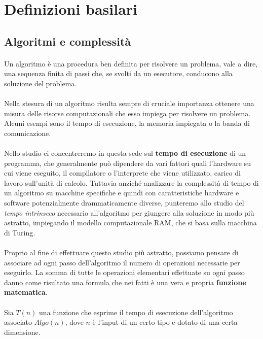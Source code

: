 \documentclass[11pt,a4paper,oneside]{article}
\begin{document}
\section{Definizioni basilari}
\subsection{Algoritmi e complessità}
\paragraph*{} Un algoritmo è una procedura ben definita per risolvere un problema, vale a dire, una sequenza finita di passi che, se svolti da un esecutore, conducono alla soluzione del problema.
\paragraph*{} Nella stesura di un algoritmo risulta sempre di cruciale importanza ottenere una misura delle risorse computazionali che esso impiega per risolvere un problema. Alcuni esempi sono il tempo di esecuzione, la memoria impiegata o la banda di comunicazione.
\paragraph*{} Nello studio ci concentreremo in questa sede sul \textbf{tempo di esecuzione} di un programma, che generalmente può dipendere da vari fattori quali l'hardware su cui viene eseguito, il compilatore o l'interprete che viene utilizzato, carico di lavoro sull'unità di calcolo. Tuttavia anziché analizzare la complessità di tempo di un algoritmo su macchine specifiche e quindi con caratteristiche hardware e software potenzialmente drammaticamente diverse, punteremo allo studio del \textit{tempo intrinseco} necessario all'algoritmo per giungere alla soluzione in modo più astratto, impiegando il modello computazionale RAM, che si basa sulla macchina di Turing.
\paragraph*{}Proprio al fine di effettuare questo studio più astratto, possiamo pensare di associare ad ogni passo dell'algoritmo il numero di operazioni necessarie per eseguirlo. La somma di tutte le operazioni elementari effettuate su ogni passo danno come risultato una formula che nei fatti è una vera e propria \textbf{funzione matematica}.
\paragraph*{}Sia $T(n)$ una funzione che esprime il tempo di esecuzione dell'algoritmo associato $Algo(n)$, dove $n$ è l'input di un certo tipo e dotato di una certa dimensione.
\end{document}
